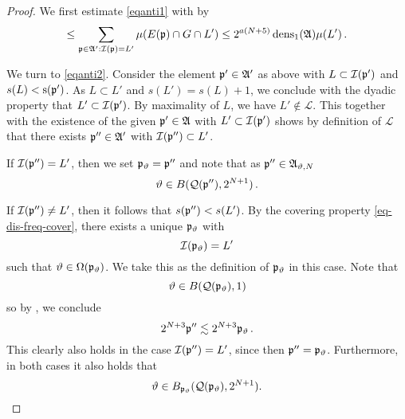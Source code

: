 \begin{proof}
We first estimate \eqref{eqanti1}
with  by
\begin{equation}\label{equanti1.5}
    \le \sum_{{\mathfrak p}\in\mathfrak{A}':{\mathcal{I}}({\mathfrak p})=L'}\mu(E({\mathfrak p})\cap G\cap L')\le 2^{a(N+5)}\operatorname{\operatorname{dens}}_1(\mathfrak{A})\mu(L')\, .
\end{equation}

We turn to \eqref{eqanti2}.
Consider the element ${\mathfrak p}'\in \mathfrak{A}'$ as above
with $L\subset {\mathcal{I}}({\mathfrak p}')$ and $s(L)<{\mathrm{s}}({\mathfrak p}')$.
As $L\subset L'$ and $s(L')=s(L)+1$, we conclude with the dyadic property that $L'\subset {\mathcal{I}}({\mathfrak p}')$.
By maximality of $L$, we have
$L'\not\in \mathcal{L}$.
This together with the existence of the given ${\mathfrak p}'\in \mathfrak{A}$
with $L'\subset {\mathcal{I}}({\mathfrak p}')$
shows by definition of $\mathcal{L}$ that there exists ${\mathfrak p}''\in \mathfrak{A}'$ with
${\mathcal{I}}({\mathfrak p}'')\subset L'$.

If ${\mathcal{I}}({\mathfrak p}'') = L'$, then we set ${\mathfrak p}_{{\vartheta}} = {\mathfrak p}''$ and note that as ${\mathfrak p}'' \in \mathfrak{A}_{{\vartheta},N}$
\begin{equation}
    {\vartheta} \in B({\mathcal{Q}}({\mathfrak p}''), 2^{N+1})\, .
\end{equation}

If ${\mathcal{I}}({\mathfrak p}'') \ne L'$, then it follows that $s({\mathfrak p}'') < s(L')$.
By the covering property \eqref{eq-dis-freq-cover}, there exists a unique ${\mathfrak p}_{{\vartheta}}$ with
\begin{equation*}
    {\mathcal{I}}({\mathfrak p}_{{\vartheta}})=L'
\end{equation*}
such that ${\vartheta}\in {\Omega}({\mathfrak p}_{{\vartheta}})$. We take this as the definition of ${\mathfrak p}_{\vartheta}$ in this case.
Note that
\begin{equation}
    {\vartheta}\in B({\mathcal{Q}}({\mathfrak p}_{{\vartheta}}), 1)
\end{equation}
so by , we conclude
\begin{equation}
    2^{N+3}{\mathfrak p}'' \lesssim 2^{N+3}{\mathfrak p}_{{\vartheta}} \, .
\end{equation}
This clearly also holds in the case ${\mathcal{I}}({\mathfrak p}'') = L'$, since then ${\mathfrak p}'' = {\mathfrak p}_{\vartheta}$. Furthermore,
in both cases it also holds that
\begin{equation}
    {\vartheta}\in B_{{\mathfrak p}_{{\vartheta}}}({\mathcal{Q}}({\mathfrak p}_{{\vartheta}}), 2^{N+1}).
\end{equation}


\end{proof}
